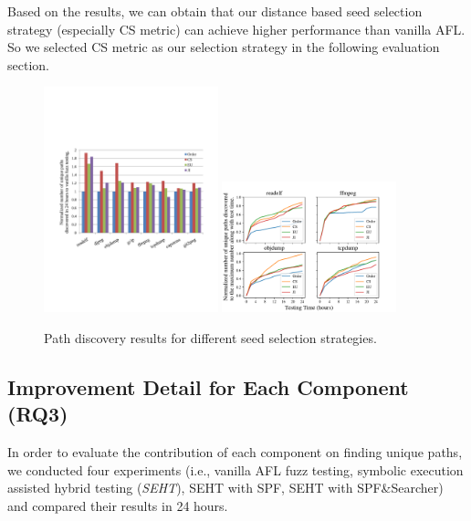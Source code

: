 Based on the results, we can obtain that our distance based seed 
selection strategy (especially CS metric) can achieve 
higher performance than vanilla AFL. So we selected CS metric as 
our selection strategy in the following evaluation section.

\begin{figure}[!t]
	\includegraphics[width=0.45\textwidth, trim={0.2cm 0.4cm 0cm 0cm}, clip]
	{figures/path-discovery.pdf}
	\includegraphics[width=0.45\textwidth, trim={0.15cm 0.1cm 1.5cm 0.8cm}, clip]
	{figures/path-time-detail.pdf} 
	\label{fig1}
  \caption{Path discovery results for different seed selection strategies.}
  \label{path-detail}
\end{figure} 

\subsection{Improvement Detail for Each Component (RQ3)} \label{sec:RQ3}
In order to evaluate the contribution of each component on finding 
unique paths, we conducted four experiments (i.e., vanilla AFL fuzz testing, 
symbolic execution assisted hybrid testing (\textit{SEHT}), SEHT with SPF, 
SEHT with SPF\&Searcher) and compared their results in 24 hours.

